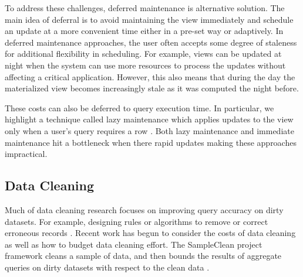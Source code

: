 To address these challenges, deferred maintenance is alternative solution.
The main idea of deferral is to avoid maintaining the view immediately and schedule an update at a more convenient time either in a pre-set way or adaptively.
In deferred maintenance approaches, the user often accepts some degree of staleness for additional flexibility in scheduling.
For example, views can be updated at night when the system can use more resources to process the updates without affecting a critical application.
However, this also means that during the day the materialized view becomes increasingly stale as it was computed the night before.

These costs can also be deferred to query execution time.
In particular, we highlight a technique called lazy maintenance which applies updates to the view only when a user's query requires a row \cite{zhou2007lazy}.
Both lazy maintenance and immediate maintenance hit a bottleneck when there rapid updates making these approaches impractical.







\subsection{Data Cleaning}
Much of data cleaning research focuses on improving query accuracy on dirty datasets.
For example, designing rules or algorithms to remove or correct erroneous records \cite{rahm2000data}.
Recent work has begun to consider the costs of data cleaning as well as how to budget data cleaning effort.
The SampleClean project framework cleans a sample of data, and then bounds the results of aggregate queries on dirty datasets with respect to the clean data \cite{wang1999sample}.

